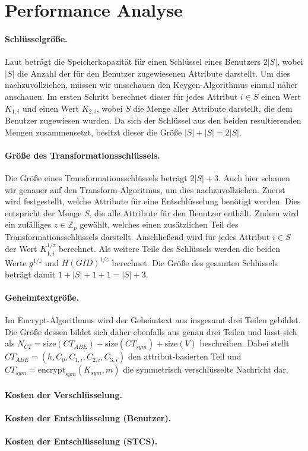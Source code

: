\newpage
\section{Performance Analyse}
\paragraph{Schlüsselgröße.}
Laut \cite{phoabe} beträgt die Speicherkapazität für einen Schlüssel eines
Benutzers $2 \lvert S \rvert$, wobei $\lvert S \rvert$ die Anzahl der für
den Benutzer zugewiesenen Attribute darstellt. Um dies nachzuvollziehen, müssen
wir unsschauen den Keygen-Algorithmus einmal näher anschauen. Im ersten Schritt
berechnet dieser für jedes Attribut $i \in S$ einen Wert $K_{1,i}$ und einen Wert
$K_{2,i}$, wobei $S$ die Menge aller Attribute darstellt, die dem Benutzer
zugewiesen wurden. Da sich der Schlüssel aus den beiden resultierenden Mengen
zusammensetzt, besitzt dieser die Größe $\lvert S \rvert + \lvert S \rvert = 2
\lvert S \rvert$.

\paragraph{Größe des Transformationsschlüssels.}
Die Größe eines Transformationsschlüssels beträgt $2 \lvert S \rvert + 3$. Auch
hier schauen wir genauer auf den Transform-Algoritmus, um dies nachzuvollziehen.
Zuerst wird festgestellt, welche Attribute für eine Entschlüsselung benötigt
werden. Dies entspricht der Menge $S$, die alle Attribute für den Benutzer
enthält. Zudem wird ein zufälliges $z \in \mathbb{Z}_p$ gewählt, welches
einen zusätzlichen Teil des Transformationsschlüssels darstellt. Anschließend
wird für jedes Attribut $i \in S$ der Wert $K_{1,i}^{1/z}$ berechnet. Als
weitere Teile des Schlüssels werden die beiden Werte $g^{1/z}$ und
$H(GID)^{1/z}$ berechnet. Die Größe des gesamten Schlüssels beträgt damit $1 +
\lvert S \rvert + 1 + 1 = \lvert S \rvert + 3$.

\paragraph{Geheimtextgröße.}
Im Encrypt-Algorithmus wird der Geheimtext aus insgesamt drei Teilen gebildet.
Die Größe dessen bildet sich daher ebenfalls aus genau drei Teilen und lässt
sich als $N_{CT} = \text{size} (CT_{ABE}) + \text{size} (CT_{sym}) + \text{size}
(V)$ beschreiben. Dabei stellt $CT_{ABE} = \left( h, C_0, C_{1,i}, C_{2,i},
C_{3,i} \right)$ den at\-tri\-but-basierten Teil und $CT_{sym} =
\text{encrypt}_{sym}\left(K_{sym}, m\right)$ die symmetrisch ver\-schlüs\-selte
Nachricht dar.

\paragraph{Kosten der Verschlüsselung.}
\paragraph{Kosten der Entschlüsselung (Benutzer).}
\paragraph{Kosten der Entschlüsselung (STCS).}
